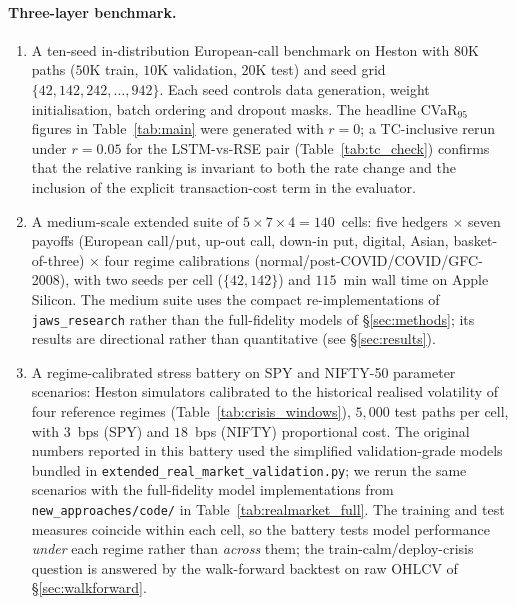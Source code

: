 \documentclass[10pt,letterpaper]{article}
\begin{document}
\paragraph{Three-layer benchmark.}
\begin{enumerate}
\item A ten-seed in-distribution European-call benchmark on Heston
with $80$K paths ($50$K train, $10$K validation, $20$K test) and
seed grid $\{42,142,242,\dots,942\}$. Each seed controls data
generation, weight initialisation, batch ordering and dropout masks.
The headline CVaR$_{95}$ figures in Table~\ref{tab:main} were
generated with $r=0$; a TC-inclusive rerun under $r=0.05$ for the
LSTM-vs-RSE pair (Table~\ref{tab:tc_check}) confirms that the
relative ranking is invariant to both the rate change and the
inclusion of the explicit transaction-cost term in the evaluator.
\item A medium-scale extended suite of
$5\!\times\!7\!\times\!4=140$~cells: five hedgers $\times$ seven
payoffs (European call/put, up-out call, down-in put, digital,
Asian, basket-of-three) $\times$ four regime calibrations
(normal/post-COVID/COVID/GFC-2008), with two seeds per cell
($\{42,142\}$) and $115$~min wall time on Apple Silicon. The
medium suite uses the compact re-implementations of
\texttt{jaws\_research} rather than the full-fidelity models of
\S\ref{sec:methods}; its results are directional rather than
quantitative (see \S\ref{sec:results}).
\item A regime-calibrated stress battery on SPY and NIFTY-50
parameter scenarios: Heston simulators calibrated to the historical
realised volatility of four reference regimes (Table~\ref{tab:crisis_windows}),
$5{,}000$ test paths per cell, with $3$~bps (SPY) and $18$~bps
(NIFTY) proportional cost. The original numbers reported in this
battery used the simplified validation-grade models bundled in
\texttt{extended\_real\_market\_validation.py}; we rerun the same
scenarios with the full-fidelity model implementations from
\texttt{new\_approaches/code/} in Table~\ref{tab:realmarket_full}.
The training and test measures coincide within each cell, so the
battery tests model performance \emph{under} each regime rather
than \emph{across} them; the train-calm/deploy-crisis question is
answered by the walk-forward backtest on raw OHLCV of
\S\ref{sec:walkforward}.
\end{enumerate}
\end{document}
